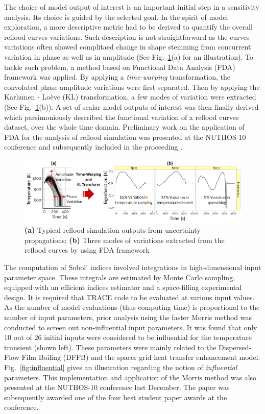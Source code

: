 \documentclass[11pt,titlepage]{article}
\begin{document}
The choice of model output of interest is an important initial step in a sensitivity analysis. Its choice is guided by the selected goal.
In the spirit of model exploration, a more descriptive metric had to be derived to quantify the overall reflood curves variations.
Such description is not straightforward as the curves variations often showed complitaed change in shape stemming from concurrent variation in phase as well as in amplitude (See Fig.~\ref{fig:output}(a) for an illustration).
To tackle such problem, a method based on Functional Data Analysis (FDA) framework was applied.
By applying a \emph{time-warping} transformation, the convoluted phase-amplitude variations were first separated. Then by applying the Karhunen - Lo\`eve (KL) transformation, a few modes of variation were extracted (See Fig.~\ref{fig:output}(b)).
A set of scalar model outputs of interest was then finally derived which parsimoniously described the functional variation of a reflood curves dataset, over the whole time domain.
Preliminary work on the application of FDA for the analysis of reflood simulation was presented at the NUTHOS-10 conference and subsequently included in the proceeding \cite{Wicaksono2014a}.

\begin{figure}[h!]
	\centering
		\includegraphics[scale=0.63]{figures/modelOutputsOfInterest.png}
	\caption{\textbf{(a)} Typical reflood simulation outputs from uncertainty propagations; \textbf{(b)} Three modes of variations extracted from the reflood curves by using FDA framework}
	\label{fig:output}
\end{figure}

The computation of Sobol' indices involved integrations in high-dimensional input parameter space.
These integrals are estimated by Monte Carlo sampling, equipped with an efficient indices estimator and a space-filling experimental design.
It is required that TRACE code to be evaluated at various input values.
As the number of model evaluations (thus computing time) is proportional to the number of input parameters, prior analysis using the faster Morris method was conducted to screen out non-influential input parameters. It was found that only 10 out of 26 initial inputs were considered to be influential for the temperature transient (shown left). 
These parameters were mainly related to the Dispersed-Flow Film Boiling (DFFB) and the spacer grid heat transfer enhancement model.
Fig.~\ref{fig:influential} gives an illustration regarding the notion of \emph{influential} parameters.
This implementation and application of the Morris method was also presented at the NUTHOS-10 conference last December\cite{Wicaksono2014b}.
The paper was subsequently awarded one of the four best student paper awards at the conference.
\end{document}
